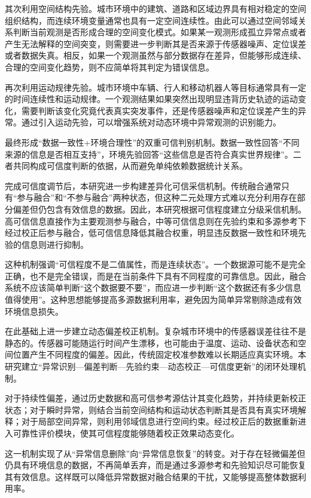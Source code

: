 其次利用空间结构先验。城市环境中的建筑、道路和区域边界具有相对稳定的空间组织结构，而连续环境变量通常也具有一定空间连续性。由此可以通过空间邻域关系判断当前观测是否形成合理的空间变化模式。如果某一观测形成孤立异常点或者产生无法解释的空间突变，则需要进一步判断其是否来源于传感器噪声、定位误差或者数据失真。相反，如果一个观测虽然与部分数据存在差异，但能够形成连续、合理的空间变化趋势，则不应简单将其判定为错误信息。

再次利用运动规律先验。城市环境中车辆、行人和移动机器人等目标通常具有一定的时间连续性和运动规律。一个观测结果如果突然出现明显违背历史轨迹的运动变化，需要判断该变化究竟代表真实突发事件，还是传感器噪声和定位误差产生的异常。通过引入运动先验，可以增强系统对动态环境中异常观测的识别能力。

最终形成“数据一致性+环境合理性”的双重可信判别机制。数据一致性回答“不同来源的信息是否相互支持”，环境先验回答“这些信息是否符合真实世界规律”。二者共同构成可信度判断的依据，从而避免单纯依赖数据统计关系。

完成可信度调节后，本研究进一步构建差异化可信采信机制。传统融合通常只有“参与融合”和“不参与融合”两种状态，但这种二元处理方式难以充分利用存在部分偏差但仍包含有效信息的数据。因此，本研究根据可信程度建立分级采信机制。高可信信息直接作为主要观测参与融合，中等可信信息则在先验约束和多源参考下经过校正后参与融合，低可信信息降低其融合权重，明显违反数据一致性和环境先验的信息则进行抑制。

这种机制强调“可信程度不是二值属性，而是连续状态”。一个数据源可能不是完全正确，也不是完全错误，而是在当前条件下具有不同程度的可靠信息。因此，融合系统不应该简单判断“这个数据要不要”，而应进一步判断“这个数据还有多少信息值得使用”。这种思想能够提高多源数据利用率，避免因为简单异常剔除造成有效环境信息损失。

在此基础上进一步建立动态偏差校正机制。复杂城市环境中的传感器误差往往不是静态的。传感器可能随运行时间产生漂移，也可能由于温度、运动、设备状态和空间位置产生不同程度的偏差。因此，传统固定校准参数难以长期适应真实环境。本研究建立“异常识别—偏差判断—先验约束—动态校正—可信度更新”的闭环处理机制。

对于持续性偏差，通过历史数据和高可信参考源估计其变化趋势，并持续更新校正状态；对于瞬时异常，则结合当前空间结构和运动状态判断其是否具有真实环境解释；对于局部空间异常，则利用邻域信息进行空间约束。经过校正后的数据重新进入可靠性评价模块，使其可信程度能够随着校正效果动态变化。

这一机制实现了从“异常信息删除”向“异常信息恢复”的转变。对于存在轻微偏差但仍具有环境信息的数据，不再简单丢弃，而是通过多源参考和先验知识尽可能恢复其有效信息。这样既可以降低异常数据对融合结果的干扰，又能够提高整体数据利用率。

